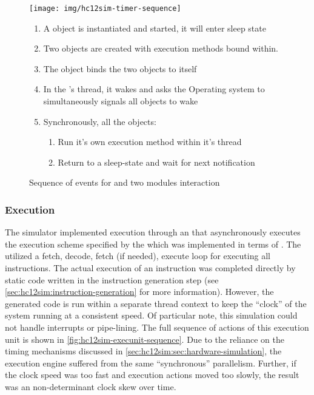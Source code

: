 \begin{figure}[!hp]
    \begin{minipage}{.5\linewidth}
        \centering
        \texttt{[image: img/hc12sim-timer-sequence]} 
    \end{minipage}%
    \begin{minipage}{.5\linewidth}
        \begin{enumerate}
            \item A  object is instantiated and started, it will enter sleep state
            \item Two  objects are created with execution methods bound within.
            \item The  object binds the two  objects to itself
            \item In the 's thread, it wakes and asks the Operating system to simultaneously signals all  objects to wake
            \item Synchronously, all the  objects:
            \begin{enumerate}
                \item Run it's own execution method within it's thread
                \item Return to a sleep-state and wait for next notification
            \end{enumerate}
        \end{enumerate}
    \end{minipage}
    \caption{Sequence of events for  and two  modules interaction \cite{Brightwell2013}} 
    \label{fig:hc12sim-timer-seq}
\end{figure}

\subsubsection*{Execution}

The simulator implemented execution through an  that asynchronously executes the execution scheme specified by the \hcmodel{} \cite[Sec.~4,~p.~47]{hc12Manual2006} which was implemented in terms of \cite[p.~59]{Vahid2002}. The  utilized a fetch, decode, fetch (if needed), execute loop for executing all instructions. The actual execution of an instruction was completed directly by static code written in the instruction generation step (see \cref{sec:hc12sim:instruction-generation} for more information). However, the generated code is run within a separate thread context to keep the ``clock'' of the system running at a consistent speed. Of particular note, this simulation could not handle interrupts or pipe-lining. The full sequence of actions of this execution unit is shown in \cref{fig:hc12sim-execunit-sequence}. Due to the reliance on the timing mechanisms discussed in \cref{sec:hc12sim:sec:hardware-simulation}, the execution engine suffered from the same ``synchronous'' parallelism. Further, if the clock speed was too fast and execution actions moved too slowly, the result was an non-determinant clock skew over time.

